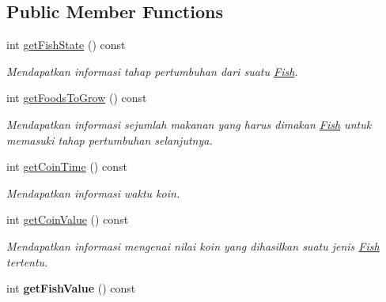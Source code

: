 \subsection*{Public Member Functions}
\begin{DoxyCompactItemize}
\item 
\mbox{\label{classFish_ab9c2e99efae1e293e660b02dfd6b3ec3}} 
int \hyperlink{classFish_ab9c2e99efae1e293e660b02dfd6b3ec3}{get\+Fish\+State} () const
\begin{DoxyCompactList}\small\item\em Mendapatkan informasi tahap pertumbuhan dari suatu \hyperlink{classFish}{Fish}. \end{DoxyCompactList}\item 
\mbox{\label{classFish_a6fec94dae5da20c2649e5cb4eab6288b}} 
int \hyperlink{classFish_a6fec94dae5da20c2649e5cb4eab6288b}{get\+Foods\+To\+Grow} () const
\begin{DoxyCompactList}\small\item\em Mendapatkan informasi sejumlah makanan yang harus dimakan \hyperlink{classFish}{Fish} untuk memasuki tahap pertumbuhan selanjutnya. \end{DoxyCompactList}\item 
\mbox{\label{classFish_aaeaf482b0fe949b02cd938dec4f4212d}} 
int \hyperlink{classFish_aaeaf482b0fe949b02cd938dec4f4212d}{get\+Coin\+Time} () const
\begin{DoxyCompactList}\small\item\em Mendapatkan informasi waktu koin. \end{DoxyCompactList}\item 
\mbox{\label{classFish_a111347fa2d2fb3ff52c697dd05ff2794}} 
int \hyperlink{classFish_a111347fa2d2fb3ff52c697dd05ff2794}{get\+Coin\+Value} () const
\begin{DoxyCompactList}\small\item\em Mendapatkan informasi mengenai nilai koin yang dihasilkan suatu jenis \hyperlink{classFish}{Fish} tertentu. \end{DoxyCompactList}\item 
\mbox{\label{classFish_a44f14e2464641108fde598d13021e58a}} 
int {\bfseries get\+Fish\+Value} () const
\item 
\mbox{\label{classFish_afab92c9739af9d442b9e1623fb56a8d1}} 

\end{DoxyCompactItemize}
